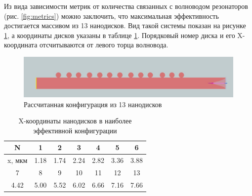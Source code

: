 Из вида зависимости метрик от количества связанных с волноводом резонаторов (рис. \ref{fig:metrics}) можно заключить, что максимальная эффективность достигается массивом из 13 нанодисков. Вид такой системы показан на рисунке \ref{fig:scheme_final_13}, а координаты дисков указаны в таблице \ref{tbl:x_coords}. Порядковый номер диска и его X-координата отсчитываются от левого торца волновода.

\begin{figure}[h]
	\includegraphics[width=\textwidth]{img/view_xy_13}
	\caption{Рассчитанная конфигурация из 13 нанодисков}
	\label{fig:scheme_final_13}
\end{figure}

\begin{table}[h]
	\centering
	\begin{tabular}{|c|c|c|c|c|c|c|}
		\hline
		N & 1 & 2 & 3 & 4 & 5 & 6 \\
		\hline
		x, мкм & 1.18 & 1.74 & 2.24 & 2.82 & 3.36 & 3.88 \\
		\hline
		\hline
		7 & 8 & 9 & 10 & 11 & 12 & 13 \\
		\hline
		4.42 & 5.00 & 5.52 & 6.02 & 6.66 & 7.16 & 7.66 \\
		\hline
	\end{tabular}
	\caption{X-координаты нанодисков в наиболее эффективной конфигурации}
	\label{tbl:x_coords}
\end{table}